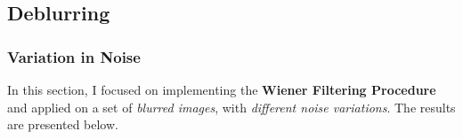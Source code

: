 \documentclass{article}
\begin{document}
    \pagebreak

    
    \subsection*{Deblurring}
    \subsubsection*{Variation in Noise}
    In this section, I focused on implementing the \textbf{Wiener Filtering Procedure} and applied on a set of \textit{blurred images}, with \textit{different noise variations}. The results are presented below. \\[10pt]
\end{document}
